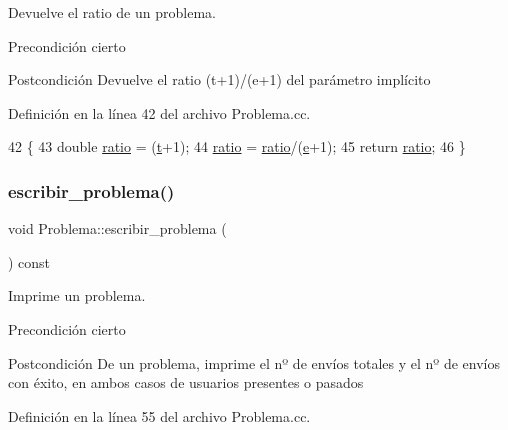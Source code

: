 Devuelve el ratio de un problema. 

\begin{DoxyPrecond}{Precondición}
cierto 
\end{DoxyPrecond}
\begin{DoxyPostcond}{Postcondición}
Devuelve el ratio (t+1)/(e+1) del parámetro implícito 
\end{DoxyPostcond}


Definición en la línea 42 del archivo Problema.\+cc.


\begin{DoxyCode}
42                                    \{
43         \textcolor{keywordtype}{double} \mbox{\hyperlink{class_problema_a8b41092b4207375e9f1bb4e29b9d4535}{ratio}} = (\mbox{\hyperlink{class_problema_a968bd889d6dc627efb59318ccc2eed7d}{t}}+1);
44         \mbox{\hyperlink{class_problema_a8b41092b4207375e9f1bb4e29b9d4535}{ratio}} = \mbox{\hyperlink{class_problema_a8b41092b4207375e9f1bb4e29b9d4535}{ratio}}/(\mbox{\hyperlink{class_problema_a725a4c8c4faf4d1a646ef7ce9db37211}{e}}+1);
45         \textcolor{keywordflow}{return} \mbox{\hyperlink{class_problema_a8b41092b4207375e9f1bb4e29b9d4535}{ratio}};
46       \}
\end{DoxyCode}
\mbox{\label{class_problema_a347d893324235e849a4e73b8d101beb3}} 
\subsubsection{\texorpdfstring{escribir\+\_\+problema()}{escribir\_problema()}}
{\footnotesize\ttfamily void Problema\+::escribir\+\_\+problema (\begin{DoxyParamCaption}{ }\end{DoxyParamCaption}) const}



Imprime un problema. 

\begin{DoxyPrecond}{Precondición}
cierto 
\end{DoxyPrecond}
\begin{DoxyPostcond}{Postcondición}
De un problema, imprime el nº de envíos totales y el nº de envíos con éxito, en ambos casos de usuarios presentes o pasados 
\end{DoxyPostcond}


Definición en la línea 55 del archivo Problema.\+cc.


